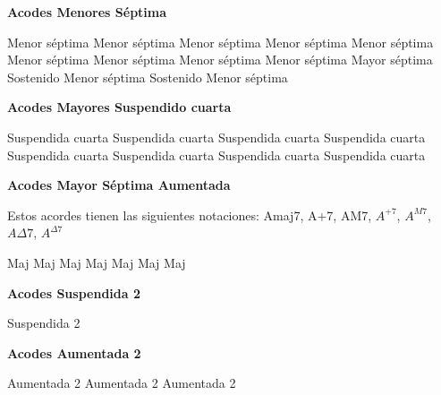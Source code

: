 \textbf{Acodes Menores S\'eptima}
\vskip 25pt

\small
{} Menor s\'eptima \qquad\qquad
{} Menor s\'eptima \qquad\qquad
{} Menor s\'eptima
\vskip 25pt
 Menor s\'eptima \qquad\qquad
{} Menor s\'eptima \qquad\qquad
{} Menor s\'eptima
\vskip 25pt
 Menor s\'eptima \qquad\qquad
{} Menor s\'eptima \qquad\qquad
{} Menor s\'eptima
\vskip 25pt
 Mayor s\'eptima \qquad\qquad
{} Sostenido Menor s\'eptima \qquad\qquad
{} Sostenido Menor s\'eptima
\normalsize

\vskip 20pt

\textbf{Acodes Mayores Suspendido cuarta}
\vskip 25pt

\small
{} Suspendida cuarta  \qquad\qquad
{} Suspendida cuarta \qquad\qquad
{} Suspendida cuarta
\vskip 25pt
 Suspendida cuarta \qquad\qquad
{} Suspendida cuarta \qquad\qquad
{} Suspendida cuarta
\vskip 25pt
 Suspendida cuarta \qquad\qquad
{} Suspendida cuarta
\normalsize

\vskip 20pt
\textbf{Acodes Mayor S\'eptima Aumentada}
\vskip 25pt

Estos acordes tienen las siguientes notaciones:
Amaj7, A+7, AM7, $A^{+7}$, $A^{M7}$, $A\Delta7$, $A^{\Delta7}$\break
\vskip 20pt

\small
{} Maj \hfill
{} Maj \hfill
{} Maj \hfill\null\break
\vskip 20pt
 Maj \hfill
{} Maj \hfill
{} Maj \hfill\null\break
\vskip 20pt
 Maj \hfill\null\break
\normalsize

\vskip 20pt
\textbf{Acodes Suspendida 2}
\vskip 25pt

\small
{} Suspendida 2
\normalsize

\vskip 20pt
\textbf{Acodes Aumentada 2}
\vskip 25pt

\small
{} Aumentada 2 \hfill
{} Aumentada 2 \hfill
{} Aumentada 2 \hfill\null\break
\normalsize


